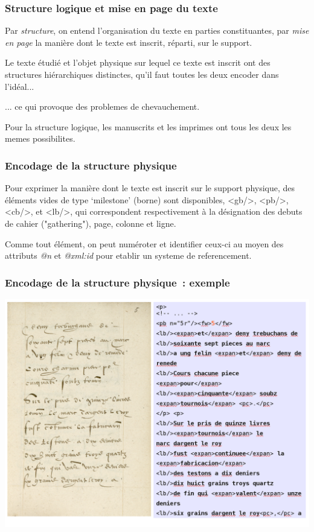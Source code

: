 \documentclass[]{beamer}\makeatletter
\begin{document}
\begin{frame}
\frametitle{Structure logique et mise en page du texte}\par
Par \textit{structure}, on entend l’organisation du texte en      parties constituantes, par \textit{mise en page} la manière dont      le texte est inscrit, réparti, sur le support.\par
Le texte étudié et l’objet physique sur lequel ce texte est inscrit      ont des structures hiérarchiques distinctes, qu’il faut toutes les      deux encoder dans l’idéal... \par
... ce qui provoque des problemes de chevauchement.\par\begin{exampleblock}{}
Pour la structure logique, les manuscrits et les imprimes      ont tous les deux les memes possibilites. \end{exampleblock}\par

\end{frame}

\begin{frame}
\frametitle{Encodage de la structure physique}\par
Pour exprimer la manière dont le texte est inscrit sur le support      physique, des éléments vides de type ‘milestone’      (borne) sont disponibles, {\color{blue2}<gb/>}, {\color{blue2}<pb/>}, {\color{blue2}<cb/>}, et       {\color{blue2}<lb/>}, qui correspondent respectivement à la désignation des      debuts de cahier ("gathering"), page, colonne et ligne. \par
Comme tout élément, on peut numéroter et identifier ceux-ci au moyen      des attributs \emph{@n} et \emph{@xml:id} pour etablir un      systeme de referencement.
\end{frame}

\begin{frame}
\frametitle{Encodage de la structure physique : exemple}\par
\includegraphics[width=\textwidth]{../Graphics/exemple-p5.png}  
\end{frame}
\end{document}
